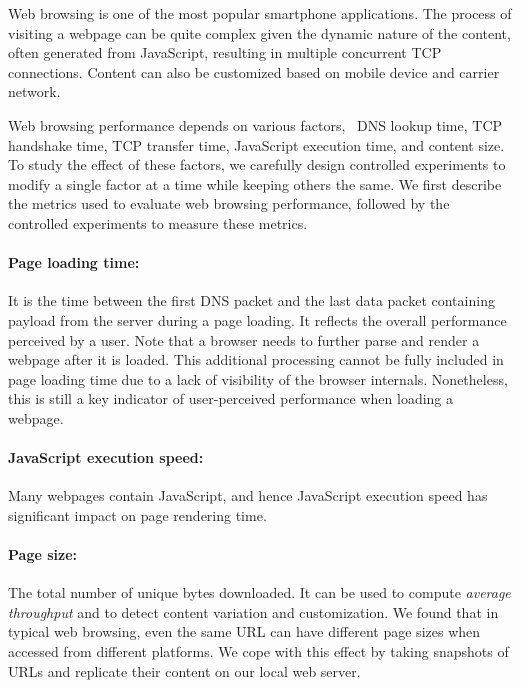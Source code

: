 Web browsing is one of the most popular smartphone applications. The 
process of visiting a webpage can be quite complex given the dynamic 
nature of the content, often generated from JavaScript, resulting in 
multiple concurrent TCP connections. Content can also be customized 
based on mobile device and carrier network.

Web browsing performance depends on various factors, \eg~DNS lookup 
time, TCP handshake time, TCP transfer time, JavaScript execution 
time, and content size. To study the effect of these factors, we 
carefully design controlled experiments to modify a single factor 
at a time while keeping others the same. We first describe the metrics 
used to evaluate web browsing performance, followed by the controlled 
experiments to measure these metrics.

\label{sec:app.web_metrics}

\paragraph{Page loading time:} It is the time between the first DNS packet 
and the last data packet containing payload from the server during a 
page loading. It reflects the overall performance perceived by a user. 
Note that a browser needs to further parse and render a webpage after 
it is loaded. This additional processing cannot be fully included in 
page loading time due to a lack of visibility of the browser internals. 
Nonetheless, this is still a key indicator of user-perceived performance 
when loading a webpage. 


\paragraph{JavaScript execution speed:} Many webpages contain 
JavaScript, and hence JavaScript execution speed has significant
impact on page rendering time. 



\paragraph{Page size:} The total number of unique bytes downloaded. 
It can be used to compute {\it average throughput} and to detect 
content variation and customization. 
We found that in typical web browsing, even the same URL can have different 
page sizes when accessed from different platforms. We cope with this 
effect by taking snapshots of URLs and replicate their content on our 
local web server.


